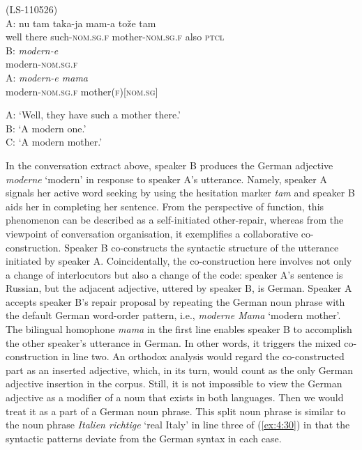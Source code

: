 \ea
\label{ex:4:34}
(LS-110526) \\
 \gll A: nu tam taka-ja mam-a tože tam \\
	{} well there such-\textsc{nom.sg.f} mother-\textsc{nom.sg.f} also \textsc{ptcl} \\
\glt 
 \gll B: \textit{modern-e} \\
	{} modern-\textsc{nom.sg.f} \\
\glt 
 \gll A: \textit{modern-e mama} \\
	{} modern-\textsc{nom.sg.f} mother(\textsc{f})[\textsc{nom.sg}] \\
\glt 

A: `Well, they have such a mother there.'\\
B: `A modern one.'\\
C: `A modern mother.'\\
\z

\noindent In the conversation extract above, speaker B produces the German adjective \textit{moderne} `modern' in response to speaker A's utterance. Namely, speaker A signals her active word seeking by using the hesitation marker \textit{tam} and speaker B aids her in completing her sentence. From the perspective of function, this phenomenon can be described as a self-initiated other-repair, whereas from the viewpoint of conversation organisation, it exemplifies a collaborative co-construction. Speaker B co-constructs the syntactic structure of the utterance initiated by speaker A. Coincidentally, the co-construction here involves not only a change of interlocutors but also a change of the code: speaker A's sentence is Russian, but the adjacent adjective, uttered by speaker B, is German. Speaker A accepts speaker B's repair proposal by repeating the German noun phrase with the default German word-order pattern, i.e., \textit{moderne Mama} `modern mother'. The bilingual homophone \textit{mama} in the first line enables speaker B to accomplish the other speaker's utterance in German. In other words, it triggers the mixed co-construction in line two. An orthodox analysis would regard the co-constructed part as an inserted adjective, which, in its turn, would count as the only German adjective insertion in the corpus. Still, it is not impossible to view the German adjective as a modifier of a noun that exists in both languages. Then we would treat it as a part of a German noun phrase. This split noun phrase is similar to the noun phrase \textit{Italien richtige} `real Italy' in line three of (\ref{ex:4:30}) in that the syntactic patterns deviate from the German syntax in each case.

